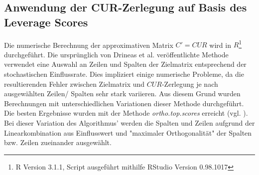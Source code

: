 \documentclass[12pt,a4paper,twoside]{article}
\begin{document}
\subsection{Anwendung der CUR-Zerlegung auf Basis des Leverage Scores}
	Die numerische Berechnung der approximativen Matrix $C'=CUR$ wird in $R$\footnote{R Version 3.1.1, Script ausgeführt mithilfe RStudio Version 0.98.1017} durchgeführt.  \newline
	Die ursprünglich von Drineas et al. \citep{mahoney2008} veröffentlichte Methode verwendet eine Auswahl an Zeilen 
	und Spalten der Zielmatrix entsprechend der stochastischen Einflussrate. Dies impliziert einige numerische 
	Probleme, da die resultierenden Fehler zwischen Zielmatrix und $CUR$-Zerlegung je nach ausgewählten Zeilen/
	Spalten sehr stark variieren. Aus diesem Grund wurden Berechnungen mit unterschiedlichen Variationen dieser 
	Methode durchgeführt. \newline
	Die besten Ergebnisse wurden mit der Methode \textit{ortho.top.scores} erreicht (vgl. \citep{bodor2012}). Bei dieser Variation des Algorithmus' werden die Spalten und Zeilen aufgrund der Linearkombination aus Einflusswert und "maximaler Orthogonalität" der Spalten bzw. Zeilen zueinander ausgewählt.
\end{document}
